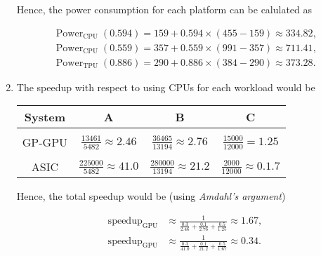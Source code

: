 \documentclass[
    12pt, %
]{fphw}
\begin{document}
\begin{enumerate}
    \noindent
    Hence, the power consumption for each platform can be calulated as

    \begin{align*}
        \operatorname{Power}_{\text{CPU}}(0.594) =
        159 + 0.594 \times (455 - 159) \approx
        334.82, \\
        \operatorname{Power}_{\text{CPU}}(0.559) =
        357 + 0.559 \times (991 - 357) \approx
        711.41, \\
        \operatorname{Power}_{\text{TPU}}(0.886) =
        290 + 0.886 \times (384 - 290) \approx
        373.28.
    \end{align*}

    \item The speedup with respect to using CPUs for each workload would be

    \begin{center}
        \begin{tabular}{cccc}
            System & A & B & C \\
            \hline \hline \\
            GP-GPU &
            $\frac{13461}{5482} \approx 2.46$ &
            $\frac{36465}{13194} \approx 2.76$ &
            $\frac{15000}{12000} = 1.25$ \\
            \\
            ASIC & $\frac{225000}{5482} \approx 41.0$ &
            $\frac{280000}{13194} \approx 21.2$ &
            $\frac{2000}{12000} \approx 0.1.7$
        \end{tabular}
    \end{center}

    Hence, the total speedup would be (using \textit{Amdahl's argument})

    \begin{align*}
        \operatorname{speedup}_{\text{GPU}} &\approx
        \frac{1}{\frac{0.3}{2.46} + \frac{0.1}{2.76} + \frac{0.5}{1.25}} \approx
        1.67, \\
        \operatorname{speedup}_{\text{GPU}} &\approx
        \frac{1}{\frac{0.3}{41.0} + \frac{0.1}{21.2} + \frac{0.5}{1.67}} \approx
        0.34.
    \end{align*}

\end{enumerate}

\end{document}
